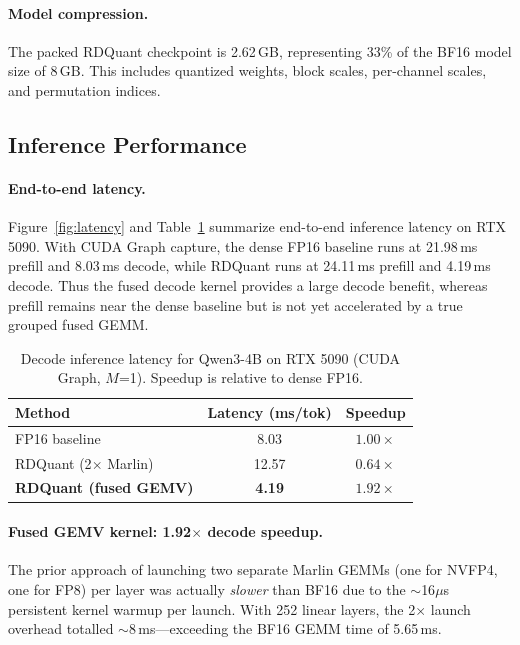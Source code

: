 \documentclass{article}
\begin{document}
\paragraph{Model compression.}
The packed RDQuant checkpoint is 2.62\,GB, representing 33\% of the BF16 model size of 8\,GB.
This includes quantized weights, block scales, per-channel scales, and permutation indices.

\subsection{Inference Performance}
\label{sec:latency}

\paragraph{End-to-end latency.}
Figure~\ref{fig:latency} and Table~\ref{tab:latency} summarize end-to-end inference latency on RTX 5090.
With CUDA Graph capture, the dense FP16 baseline runs at 21.98\,ms prefill and 8.03\,ms decode, while RDQuant runs at 24.11\,ms prefill and 4.19\,ms decode.
Thus the fused decode kernel provides a large decode benefit, whereas prefill remains near the dense baseline but is not yet accelerated by a true grouped fused GEMM.

\begin{table}[t]
\centering
\caption{Decode inference latency for Qwen3-4B on RTX 5090 (CUDA Graph, $M$=1). Speedup is relative to dense FP16.}
\label{tab:latency}
\begin{tabular}{lcc}
\toprule
\textbf{Method} & \textbf{Latency (ms/tok)} & \textbf{Speedup} \\
\midrule
FP16 baseline & 8.03 & $1.00\times$ \\
RDQuant (2$\times$ Marlin) & 12.57 & $0.64\times$ \\
\textbf{RDQuant (fused GEMV)} & \textbf{4.19} & $\mathbf{1.92\times}$ \\
\bottomrule
\end{tabular}
\end{table}

\paragraph{Fused GEMV kernel: 1.92$\times$ decode speedup.}
The prior approach of launching two separate Marlin GEMMs (one for NVFP4, one for FP8) per layer was actually \emph{slower} than BF16 due to the $\sim$16$\mu$s persistent kernel warmup per launch.
With 252 linear layers, the 2$\times$ launch overhead totalled $\sim$8\,ms---exceeding the BF16 GEMM time of 5.65\,ms.
\end{document}
